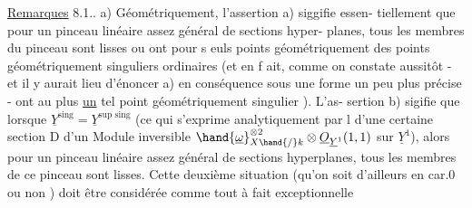 \uline{Remarques} 8.1.. a) Géométriquement, l'assertion a) siggifie essen-%
tiellement que pour un pinceau linéaire assez général de sections hyper-%
planes, tous les membres du pinceau sont lisses ou ont 
 pour s euls points géométriquement des points géométriquement
singuliers ordinaires (et en f ait, comme on constate aussitôt - et il
y aurait lieu d'énoncer a) en conséquence sous une forme un peu plus
précise - ont au plus \uline{un} tel point géométriquement singulier ). L'as-%
sertion b) sigifie  que lorsque $\underline{Y}^{\text{sing}}=\underline{Y}^{\text{sup sing}}$ (ce qui s'exprime
analytiquement par l  d'une certaine section D d'un Module
inversible $\hand{\underline{\omega}}^{\otimes 2}_{X\hand{/}k}\otimes\underline{O}_{\underline{Y}^1}(1,1)$ sur $\underline{Y}^1$), alors pour un pinceau linéaire
assez général de sections hyperplanes, tous les membres de ce 
pinceau sont lisses. Cette deuxième situation (qu'on soit d'ailleurs
en car.0 ou non ) doit être considérée comme tout à fait exceptionnelle

